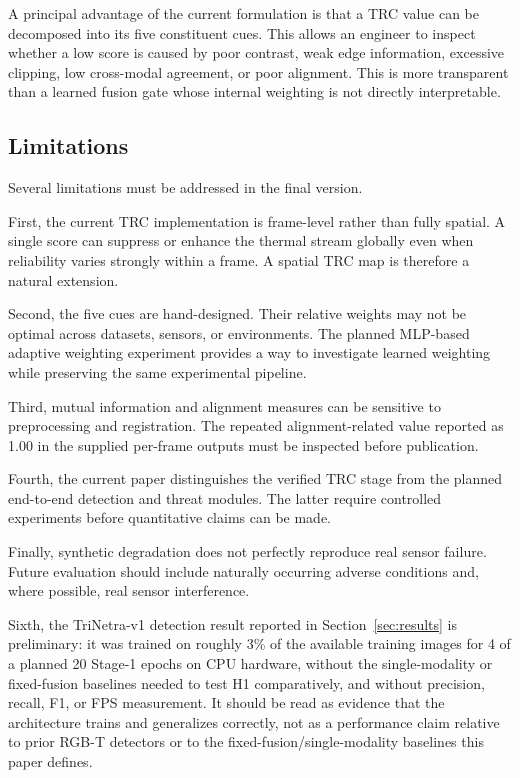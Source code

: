 \documentclass[conference]{IEEEtran}
\begin{document}
A principal advantage of the current formulation is that a TRC value can be decomposed into its five constituent cues. This allows an engineer to inspect whether a low score is caused by poor contrast, weak edge information, excessive clipping, low cross-modal agreement, or poor alignment. This is more transparent than a learned fusion gate whose internal weighting is not directly interpretable.

\subsection{Limitations}

Several limitations must be addressed in the final version.

First, the current TRC implementation is frame-level rather than fully spatial. A single score can suppress or enhance the thermal stream globally even when reliability varies strongly within a frame. A spatial TRC map is therefore a natural extension.

Second, the five cues are hand-designed. Their relative weights may not be optimal across datasets, sensors, or environments. The planned MLP-based adaptive weighting experiment provides a way to investigate learned weighting while preserving the same experimental pipeline.

Third, mutual information and alignment measures can be sensitive to preprocessing and registration. The repeated alignment-related value reported as 1.00 in the supplied per-frame outputs must be inspected before publication.

Fourth, the current paper distinguishes the verified TRC stage from the planned end-to-end detection and threat modules. The latter require controlled experiments before quantitative claims can be made.

Finally, synthetic degradation does not perfectly reproduce real sensor failure. Future evaluation should include naturally occurring adverse conditions and, where possible, real sensor interference.

Sixth, the TriNetra-v1 detection result reported in Section~\ref{sec:results} is preliminary: it was trained on roughly 3\% of the available training images for 4 of a planned 20 Stage-1 epochs on CPU hardware, without the single-modality or fixed-fusion baselines needed to test H1 comparatively, and without precision, recall, F1, or FPS measurement. It should be read as evidence that the architecture trains and generalizes correctly, not as a performance claim relative to prior RGB-T detectors or to the fixed-fusion/single-modality baselines this paper defines.
\end{document}
